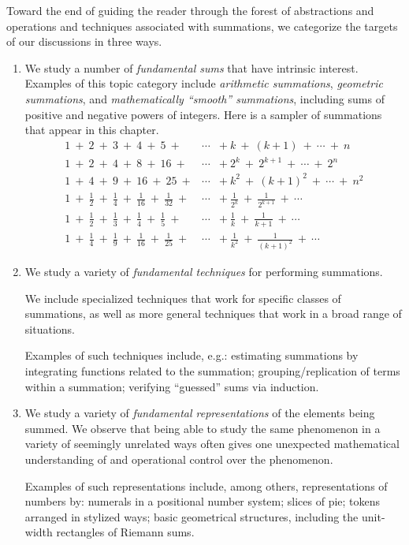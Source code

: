 Toward the end of guiding the reader through the forest of
abstractions and operations and techniques associated with summations,
we categorize the targets of our discussions in three ways.
\begin{enumerate}
\item
We study a number of {\it fundamental sums} that have intrinsic
interest.
Examples of this topic category include {\it arithmetic summations},
{\it geometric summations}, and {\it mathematically ``smooth''
  summations}, including sums of positive and negative powers of
integers.  Here is a sampler of summations that appear in this
chapter.
\[
\begin{array}{lcl}
1 \ + \ 2 \ + \ 3 \ + \ 4 \ + \ 5 \ + & \cdots & + \ k  \ + \ (k+1) \ +
\ \cdots \ + \ n \\
1 \ + \ 2 \ + \ 4 \ + \ 8 \ + \ 16 \ + & \cdots & + \ 2^k  \ +
\ 2^{k+1} \ + \ \cdots \ + \ 2^n \\
1 \ + \ 4 \ + \ 9 \ + \ 16 \ + \ 25 \ + & \cdots & + \ k^2  \ + \ (k+1)^2 \ +
\ \cdots \ + \ n^2 \\
1 \ + \ \frac{1}{2} \ + \ \frac{1}{4} \ + \ \frac{1}{16} \ +
\ \frac{1}{32} \ + & \cdots & + \ \frac{1}{2^k}  \ + \ \frac{1}{2^{k+1}} \ +
\ \cdots \\
1 \ + \ \frac{1}{2} \ + \ \frac{1}{3} \ + \ \frac{1}{4} \ +
\ \frac{1}{5} \ + & \cdots & + \ \frac{1}{k}  \ + \ \frac{1}{k+1} \ +
\ \cdots \\
1 \ + \ \frac{1}{4} \ + \ \frac{1}{9} \ + \ \frac{1}{16} \ +
\ \frac{1}{25} \ + & \cdots & + \ \frac{1}{k^2}  \ + \ \frac{1}{(k+1)^2} \ +
\ \cdots
\end{array}
\]

\item
We study a variety of {\it fundamental techniques} for performing
summations.

We include specialized techniques that work for specific classes of
summations, as well as more general techniques that work in a broad
range of situations.

Examples of such techniques include, e.g.: estimating summations by
integrating functions related to the summation; grouping/replication
of terms within a summation; verifying ``guessed'' sums via induction.

\item
We study a variety of {\it fundamental representations} of the
elements being summed.  We observe that being able to study the same
phenomenon in a variety of seemingly unrelated ways often gives one
unexpected mathematical understanding of and operational control over
the phenomenon.

Examples of such representations include, among others,
representations of numbers by: numerals in a positional number system;
slices of pie; tokens arranged in stylized ways; basic geometrical
structures, including the unit-width rectangles of Riemann sums.
\end{enumerate}

